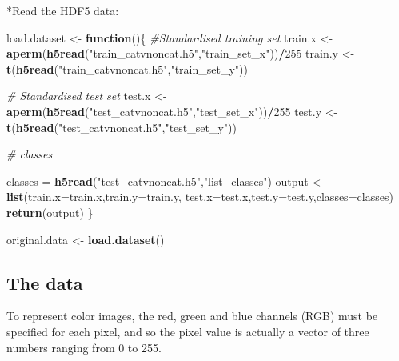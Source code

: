 \documentclass[]{article}
\newenvironment{Shaded}{\begin{snugshade}}{\end{snugshade}}
\newcommand{\KeywordTok}[1]{\textcolor[rgb]{0.13,0.29,0.53}{\textbf{#1}}}
\newcommand{\DataTypeTok}[1]{\textcolor[rgb]{0.13,0.29,0.53}{#1}}
\newcommand{\DecValTok}[1]{\textcolor[rgb]{0.00,0.00,0.81}{#1}}
\newcommand{\StringTok}[1]{\textcolor[rgb]{0.31,0.60,0.02}{#1}}
\newcommand{\CommentTok}[1]{\textcolor[rgb]{0.56,0.35,0.01}{\textit{#1}}}
\newcommand{\ControlFlowTok}[1]{\textcolor[rgb]{0.13,0.29,0.53}{\textbf{#1}}}
\newcommand{\OperatorTok}[1]{\textcolor[rgb]{0.81,0.36,0.00}{\textbf{#1}}}
\newcommand{\NormalTok}[1]{#1}
\begin{document}
*Read the HDF5 data:

\begin{Shaded}
\begin{Highlighting}[]
\NormalTok{load.dataset <-}\StringTok{ }\ControlFlowTok{function}\NormalTok{()\{}
\CommentTok{#Standardised training set}
\NormalTok{train.x <-}\StringTok{ }\KeywordTok{aperm}\NormalTok{(}\KeywordTok{h5read}\NormalTok{(}\StringTok{"train_catvnoncat.h5"}\NormalTok{,}\StringTok{"train_set_x"}\NormalTok{))}\OperatorTok{/}\DecValTok{255}
\NormalTok{train.y <-}\StringTok{ }\KeywordTok{t}\NormalTok{(}\KeywordTok{h5read}\NormalTok{(}\StringTok{"train_catvnoncat.h5"}\NormalTok{,}\StringTok{"train_set_y"}\NormalTok{))}


\CommentTok{# Standardised test set}
\NormalTok{test.x <-}\StringTok{ }\KeywordTok{aperm}\NormalTok{(}\KeywordTok{h5read}\NormalTok{(}\StringTok{"test_catvnoncat.h5"}\NormalTok{,}\StringTok{"test_set_x"}\NormalTok{))}\OperatorTok{/}\DecValTok{255}
\NormalTok{test.y <-}\StringTok{ }\KeywordTok{t}\NormalTok{(}\KeywordTok{h5read}\NormalTok{(}\StringTok{"test_catvnoncat.h5"}\NormalTok{,}\StringTok{"test_set_y"}\NormalTok{))}

\CommentTok{# classes }

\NormalTok{classes =}\StringTok{ }\KeywordTok{h5read}\NormalTok{(}\StringTok{"test_catvnoncat.h5"}\NormalTok{,}\StringTok{"list_classes"}\NormalTok{)}
\NormalTok{output <-}\StringTok{ }\KeywordTok{list}\NormalTok{(}\DataTypeTok{train.x=}\NormalTok{train.x,}\DataTypeTok{train.y=}\NormalTok{train.y,}
               \DataTypeTok{test.x=}\NormalTok{test.x,}\DataTypeTok{test.y=}\NormalTok{test.y,}\DataTypeTok{classes=}\NormalTok{classes)}
\KeywordTok{return}\NormalTok{(output)}
\NormalTok{\}}
\end{Highlighting}
\end{Shaded}

\begin{Shaded}
\begin{Highlighting}[]
\NormalTok{original.data <-}\StringTok{ }\KeywordTok{load.dataset}\NormalTok{()}
\end{Highlighting}
\end{Shaded}

\subsection{The data}\label{the-data}

To represent color images, the red, green and blue channels (RGB) must
be specified for each pixel, and so the pixel value is actually a vector
of three numbers ranging from 0 to 255.
\end{document}
